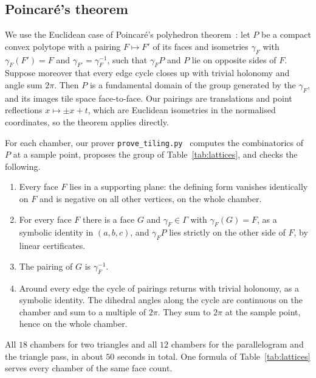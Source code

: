 \documentclass[11pt]{amsart}
\theoremstyle{definition}
\begin{document}
\subsection{Poincar\'e's theorem}
We use the Euclidean case of Poincar\'e's polyhedron theorem~\cite{EP94}: let $P$ be a compact convex polytope with
a pairing $F\mapsto F'$ of its faces and isometries $\gamma_F$ with $\gamma_F(F')=F$ and $\gamma_{F'}=\gamma_F^{-1}$,
such that $\gamma_F P$ and $P$ lie on opposite sides of $F$. Suppose moreover that every edge cycle closes up with
trivial holonomy and angle sum $2\pi$. Then $P$ is a fundamental domain of the group generated by the $\gamma_F$, and its
images tile space face-to-face. Our pairings are translations and point reflections $x\mapsto\pm x+t$, which are
Euclidean isometries in the normalised coordinates, so the theorem applies directly.

For each chamber, our prover \texttt{prove\_tiling.py}~\cite{code} computes the combinatorics of $P$ at a sample point,
proposes the group of Table~\ref{tab:lattices}, and checks the following.
\begin{enumerate}[label=(\roman*),leftmargin=2.5em]
\item Every face $F$ lies in a supporting plane: the defining form vanishes identically on $F$ and is negative on
all other vertices, on the whole chamber.
\item For every face $F$ there is a face $G$ and $\gamma_F\in\Gamma$ with $\gamma_F(G)=F$, as a symbolic identity in
$(a,b,c)$, and $\gamma_F P$ lies strictly on the other side of $F$, by linear certificates.
\item[(ii$'$)] The pairing of $G$ is $\gamma_F^{-1}$.
\item[(iii)] Around every edge the cycle of pairings returns with trivial holonomy, as a symbolic identity. The
dihedral angles along the cycle are continuous on the chamber and sum to a multiple of $2\pi$. They sum to $2\pi$ at the
sample point, hence on the whole chamber.
\end{enumerate}
All $18$ chambers for two triangles and all $12$ chambers for the parallelogram and the triangle pass, in about $50$
seconds in total. One formula of Table~\ref{tab:lattices} serves every chamber of the same face count.
\end{document}
